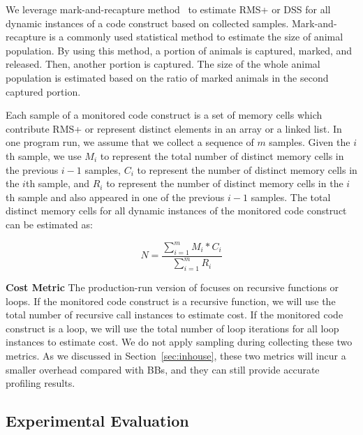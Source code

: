 We leverage mark-and-recapture method~\citep{mark-recapture} to 
estimate RMS+ or DSS for all dynamic instances of a code construct 
based on collected samples. 
Mark-and-recapture is a commonly used statistical method 
to estimate the size of animal population. 
By using this method, a portion of animals is captured, marked, and released. 
Then, another portion is captured.
The size of the whole animal population is estimated 
based on the ratio of marked animals in the second captured portion.  


Each sample of a monitored code construct is a set of memory cells 
which contribute RMS+ or represent distinct elements in an array or a linked list. 
In one program run, we assume that we collect a sequence of $m$ samples. 
Given the $i$th sample, we use $M_i$ to represent the 
total number of distinct memory cells in the previous $i-1$ samples, 
$C_i$ to represent the number of distinct memory cells in the $i$th sample,
and $R_i$ to represent the number of distinct memory cells in 
the $i$th sample and also appeared in one of the previous $i-1$ samples.
The total distinct memory cells for all dynamic instances 
of the monitored code construct can be estimated as:


\begin{equation} \label{eq:mark}
N = \frac{\sum\limits_{i=1}^m M_i*C_i}{\sum\limits_{i=1}^m R_i}
\end{equation}

\noindent\textbf{Cost Metric}
The production-run version of \Tool focuses on recursive functions or loops.
If the monitored code construct is a recursive function,
we will use the total number of recursive call instances to estimate cost.
If the monitored code construct is a loop, 
we will use the total number of loop iterations for all loop instances to estimate cost. 
We do not apply sampling during collecting these two metrics. 
As we discussed in Section~\ref{sec:inhouse},
these two metrics will incur a smaller overhead compared with BBs, 
and they can still provide accurate profiling results.  


\subsection{Experimental Evaluation}

